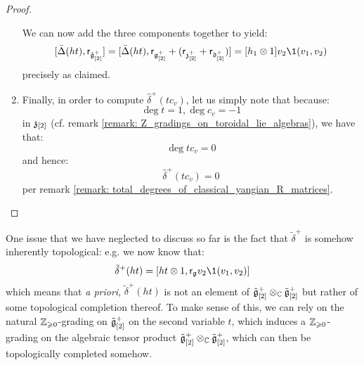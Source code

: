 \begin{proof}
\begin{enumerate}
                    We can now add the three components together to yield:
                        $$[\bar{\Delta}(ht), \sfr_{\hat{\g}_{[2]}^+}] = [ \bar{\Delta}(ht), \sfr_{\g_{[2]}^+} + (\sfr_{\z_{[2]}^+} + \sfr_{\d_{[2]}^+}) ] =  [h_1 \tensor 1] v_2 \1(v_1, v_2)$$
                    precisely as claimed. 
                    
                    \item Finally, in order to compute $\hat{\delta}^+(t c_v)$, let us simply note that because:
                        $$\deg t = 1, \deg c_v = -1$$
                    in $\mathfrak{z}_{[2]}$ (cf. remark \ref{remark: Z_gradings_on_toroidal_lie_algebras}), we have that:
                        $$\deg t c_v = 0$$
                    and hence:
                        $$\hat{\delta}^+(t c_v) = 0$$
                    per remark \ref{remark: total_degrees_of_classical_yangian_R_matrices}.
                \end{enumerate}
            \end{proof}

        One issue that we have neglected to discuss so far is the fact that $\tilde{\delta}^+$ is somehow inherently topological: e.g. we now know that:
            $$\tilde{\delta}^+(ht) = [ht \tensor 1, \sfr_{\g} v_2 \1(v_1, v_2)]$$
        which means that \textit{a priori}, $\tilde{\delta}^+(ht)$ is not an element of $\tilde{\g}_{[2]}^+ \tensor_{\bbC} \tilde{\g}_{[2]}^+$ but rather of some topological completion thereof. To make sense of this, we can rely on the natural $\mathbb{Z}_{\geqslant 0}$-grading on $\tilde{\mathfrak{g}}_{[2]}^+$ on the second variable $t$, which induces a $\mathbb{Z}_{\geqslant 0}$-grading on the algebraic tensor product $\tilde{\g}_{[2]}^+ \tensor_{\bbC} \tilde{\g}_{[2]}^+$, which can then be topologically completed somehow. 

